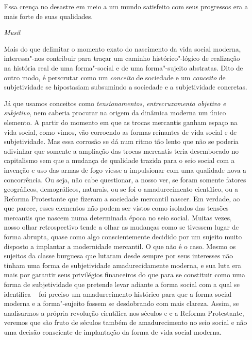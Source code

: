 \begin{flushright}
\scriptsize{Essa crença no desastre em meio a um mundo satisfeito com seus
progressos era a mais forte de suas qualidades.

\emph{Musil}}
\end{flushright}

Mais do que delimitar o momento exato do nascimento da vida social
moderna, interessa"-nos contribuir para traçar um caminho
histórico"-lógico de realização na história real de uma forma"-social e de
uma forma"-sujeito abstratas. Dito de outro modo, é perscrutar como um
\emph{conceito} de sociedade e um \emph{conceito} de subjetividade se
hipostasiam subsumindo a sociedade e a subjetividade concretas.

Já que usamos conceitos como \emph{tensionamentos},
\emph{entrecruzamento objetivo e subjetivo}, nem caberia procurar na
origem da dinâmica moderna um único elemento. A partir do momento em que
as trocas mercantis ganham espaço na vida social, como vimos, vão
corroendo as formas reinantes de vida social e de subjetividade. Mas
essa corrosão se dá num ritmo tão lento que não se poderia adivinhar que
somente a ampliação das trocas mercantis teria desembocado no
capitalismo sem que a mudança de qualidade trazida para o seio social
com a invenção e uso das armas de fogo viesse a impulsionar com uma
qualidade nova a concorrência. Ou seja, não cabe questionar, a nosso
ver, se foram somente fatores geográficos, demográficos, naturais, ou se
foi o amadurecimento científico, ou a Reforma Protestante que fizeram a
sociedade mercantil nascer. Em verdade, ao que parece, esses elementos
não podem ser vistos como isolados das tensões mercantis que nascem numa
determinada época no seio social. Muitas vezes, nosso olhar
retrospectivo tende a olhar as mudanças como se tivessem lugar de forma
abrupta, quase como algo conscientemente decidido por um sujeito muito
disposto a implantar a modernidade mercantil. O que não é o caso. Mesmo
os sujeitos da classe burguesa que lutaram desde sempre por seus
interesses não tinham uma forma de subjetividade amadurecidamente
moderna, e sua luta era mais por garantir seus privilégios financeiros
do que para se constituir como uma forma de subjetividade que pretende
levar adiante a forma social com a qual se identifica -- foi preciso um
amadurecimento histórico para que a forma social moderna e a
forma"-sujeito fossem se desdobrando com mais clareza. Assim, se
analisarmos a própria revolução científica nos séculos  e  e a
Reforma Protestante, veremos que são fruto de séculos também de
amadurecimento no seio social e não uma decisão consciente de
implantação da forma de vida social moderna.

